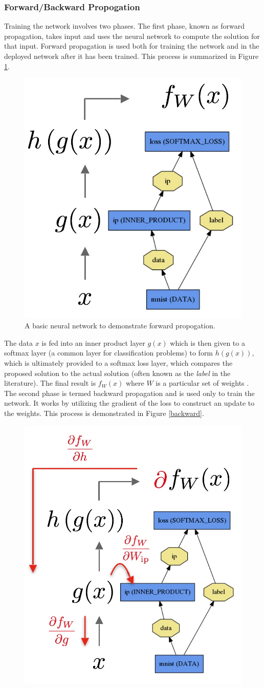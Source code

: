 \documentclass[twoside]{article}
\begin{document}
\begin{multicols}{2}
\subsubsection{Forward/Backward Propogation}
Training the network involves two phases. The first phase, known as forward propagation, takes input and uses the neural network to compute the solution for that input. Forward propagation is used both for training the network and in the deployed network after it has been trained. This process is summarized in Figure \ref{forward}.
\begin{figure}[H]
	\centering
	\includegraphics[width=0.6\linewidth]{images/forward}
	\caption{A basic neural network to demonstrate forward propogation. \cite{caffe}}
	\label{forward}
\end{figure}
The data $x$ is fed into an inner product layer $g(x)$ which is then given to a softmax layer (a common layer for classification problems) to form $h(g(x))$, which is ultimately provided to a softmax loss layer, which compares the proposed solution to the actual solution (often known as the \textit{label} in the literature). The final result is $f_W(x)$ where $W$ is a particular set of weights \cite{caffe}.
The second phase is termed backward propagation and is used only to train the network. It works by utilizing the gradient of the loss to construct an update to the weights. This process is demonstrated in Figure \ref{backward}.
\begin{figure}[H]
	\centering
	\includegraphics[width=0.6\linewidth]{images/backward}

\end{figure}
\end{multicols}
\end{document}
